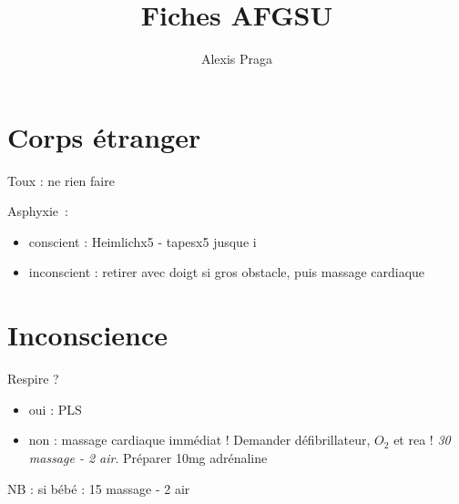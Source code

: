 


\title{Fiches AFGSU}
\author{Alexis Praga}
\maketitle

\section{Corps étranger}%
\label{sec:corps_etranger}

  Toux : ne rien faire

Asphyxie :
\begin{itemize}
  \item conscient : Heimlichx5 - tapesx5 jusque i
  \item inconscient : retirer avec doigt si gros obstacle, puis massage
    cardiaque
\end{itemize}

\section{Inconscience}%
\label{sec:inconscience}

Respire ?
\begin{itemize}
  \item oui : PLS
  \item non : massage cardiaque immédiat ! Demander défibrillateur, $O_2$ et rea !
    \textit{30 massage - 2 air}. Préparer 10mg adrénaline
\end{itemize}

NB : si bébé : 15 massage - 2 air




